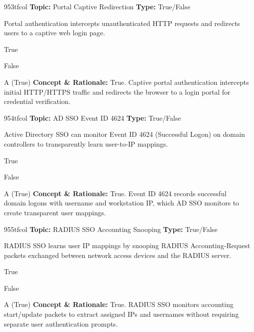 \begin{qcard}{953}{tfcol}
\textcolor{darkslate!75}{\small\textbf{Topic:} Portal Captive Redirection \hfill \textbf{Type:} True/False}\vspace{0.4em}\par
Portal authentication intercepts unauthenticated HTTP requests and redirects users to a captive web login page.
\begin{qoptions}
\item True
\item False
\end{qoptions}
\end{qcard}
\nopagebreak
\begin{explainbox}{A (True)}
\textbf{Concept \& Rationale:} True. Captive portal authentication intercepts initial HTTP/HTTPS traffic and redirects the browser to a login portal for credential verification.
\end{explainbox}

\begin{qcard}{954}{tfcol}
\textcolor{darkslate!75}{\small\textbf{Topic:} AD SSO Event ID 4624 \hfill \textbf{Type:} True/False}\vspace{0.4em}\par
Active Directory SSO can monitor Event ID 4624 (Successful Logon) on domain controllers to transparently learn user-to-IP mappings.
\begin{qoptions}
\item True
\item False
\end{qoptions}
\end{qcard}
\nopagebreak
\begin{explainbox}{A (True)}
\textbf{Concept \& Rationale:} True. Event ID 4624 records successful domain logons with username and workstation IP, which AD SSO monitors to create transparent user mappings.
\end{explainbox}

\begin{qcard}{955}{tfcol}
\textcolor{darkslate!75}{\small\textbf{Topic:} RADIUS SSO Accounting Snooping \hfill \textbf{Type:} True/False}\vspace{0.4em}\par
RADIUS SSO learns user IP mappings by snooping RADIUS Accounting-Request packets exchanged between network access devices and the RADIUS server.
\begin{qoptions}
\item True
\item False
\end{qoptions}
\end{qcard}
\nopagebreak
\begin{explainbox}{A (True)}
\textbf{Concept \& Rationale:} True. RADIUS SSO monitors accounting start/update packets to extract assigned IPs and usernames without requiring separate user authentication prompts.
\end{explainbox}

